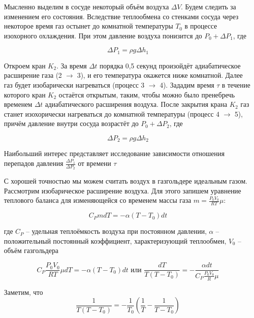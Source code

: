 \documentclass[a4paper, 14pt]{article}
\begin{document}
    Мысленно выделим в сосуде некоторый объём воздуха $\Delta V$.
    Будем следить за изменением его состояния.
    Вследствие теплообмена со стенками сосуда через некоторое время газ остынет до комнатной температуры $T_0$ в
    процессе изохорного охлаждения.
    При этом давление воздуха понизится до $P_0 + \Delta P_1$, где

    \begin{equation}
        \label{eq:delta1}
        \Delta P_1 = \rho g \Delta h_1
    \end{equation}

    Откроем кран $K_2$.
    За время $\Delta t$ порядка 0,5 секунд произойдёт адиабатическое расширение газа (2 $\rightarrow$ 3), и его
    температура окажется ниже комнатной.
    Далее газ будет изобарически нагреваться (процесс 3 $\rightarrow$ 4).
    Зададим время $\tau$ в течение которого кран $K_2$ остаётся открытым, таким, чтобы можно было пренебречь временем
    $\Delta t$ адиабатического расширения воздуха.
    После закрытия крана $K_2$ газ станет изохорически нагреваться до комнатной температуры (процесс 4 $\rightarrow$
    5), причём давление внутри сосуда возрастёт до $P_0 + \Delta P_2$, где

    \begin{equation}
        \label{eq:delta2}
        \Delta P_2 = \rho g \Delta h_2
    \end{equation}

    Наибольший интерес представляет исследование зависимости отношения перепадов давления $\frac{\Delta P_1}{\Delta
    P_2}$ от времени $\tau$

    С хорошей точностью мы можем считать воздух в газгольдере идеальным газом.
    Рассмотрим изобарическое расширение воздуха.
    Для этого запишем уравнение теплового баланса для изменяющейся со временем массы газа $m = \frac{P_0 V_0}{RT} \mu$:

    \[ C_P m dT = - \alpha (T - T_0) dt\]

    где $C_P$ -- удельная теплоёмкость воздуха при постоянном давлении, $\alpha$ -- положительный постоянный
    коэффициент, характеризующий теплообмен, $V_0$ -- объём газгольдера

    \[ C_P \frac{P_0 V_0}{RT} \mu dT = - \alpha (T - T_0) dt \text{ или } \frac{dT}{T(T - T_0)} = - \frac{\alpha dt}{C_P
    \frac{P_0 V_0}{R} \mu} \]

    Заметим, что
    \[ \frac{1}{T(T - T_0)} = - \frac{1}{T_0} \left( \frac{1}{T} - \frac{1}{T - T_0} \right) \]
\end{document}

